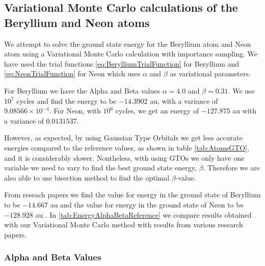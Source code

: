 \subsection{Variational Monte Carlo calculations of the Beryllium and Neon atoms}

	We attempt to solve the ground state energy for the Beryllium atom and Neon atom using a Variational Monte Carlo calculation with importance sampling. We have used the trial functions \eqref{eq:BerylliumTrialFunction} for Beryllium and \eqref{eq:NeonTrialFunction} for Neon which uses $\alpha$ and $\beta$ as variational parameters.

	For Beryllium we have the Alpha and Beta values $\alpha=4.0$ and $\beta=0.31$. We use $10^{7}$ cycles and find the energy to be $-14.3902$ au, with a variance of $9.08566 \times 10^{-4}$.
	For Neon, with $10^{6}$ cycles, we get an energy of $-127.875$ au with a variance of $0.0131537$.

	However, as expected, by using Gaussian Type Orbitals we get less accurate energies compared to the reference values, as shown in table \ref{tab:AtomsGTO}, and it is considerably slower. Nontheless, with using GTOs we only have one variable we need to vary to find the best ground state energy, $\beta$. Therefore we are also able to use bisection method to find the optimal $\beta$-value.

	From reseach papers we find the value for energy in the ground state
	of Beryllium to be $-14.667$ au \parencite{Koput_2011_PCCP}  and the value
	for energy in the ground state of Neon to be \(-128.928\) au \parencite{Binkley_1975}.
	In \cref{tab:EnergyAlphaBetaReference} we compare results
	obtained with our Variational Monte Carlo method with results from
	various research papers.

	\subsubsection{Alpha and Beta Values}

